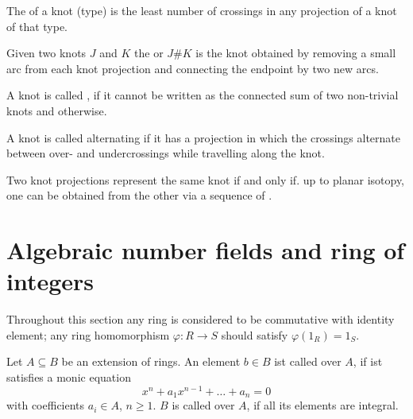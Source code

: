 
\begin{definition}[{name=[crossing number]}]
	The  of a knot (type) is the least number of crossings in any projection of a knot of that type.
\end{definition}

\begin{definition}
	Given two knots $J$ and $K$ the  or  $J\#K$ is the knot obtained by removing a small arc from each knot projection and connecting the endpoint by two new arcs.

	A knot is called , if it cannot be written as the connected sum of two non-trivial knots and  otherwise.
\end{definition}

\begin{definition}
	A knot is called alternating if it has a projection in which the crossings alternate between over- and undercrossings while travelling along the knot.
\end{definition}

\begin{lemma}
	Two knot projections represent the same knot if and only if. up to planar isotopy, one can be obtained from the other via a sequence of .
\end{lemma}




\section{Algebraic number fields and ring of integers} %
\label{sec:rings_and_ideals}
Throughout this section any ring is considered to be commutative with identity element; any ring homomorphism $\varphi \colon R \to S$ should satisfy $\varphi(1_R) =1_S$.

\begin{definition}[{name=[Integral Elements]{\cite[Def.~2.1]{neukirch}}}]
	Let $A \subseteq B$ be an extension of rings.
	An element $b \in B$ ist called  over $A$, if ist satisfies a monic equation
	\[
		x^n + a_1 x^{n-1} + \ldots + a_n =0
	\]
	with coefficients $a_i \in A$, $n\ge 1$.
	$B$ is called  over $A$, if all its elements are integral.
\end{definition}


